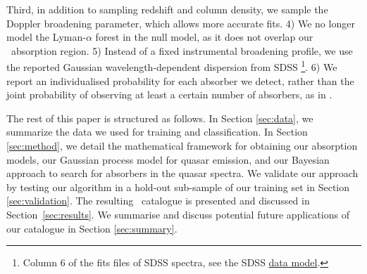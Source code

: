 \documentclass[fleqn,usenatbib]{mnras}
\newcommand{\civ}{\ion{C}{IV}}
\begin{document}
Third, in addition to sampling redshift and column density, we sample the Doppler broadening parameter, which allows more accurate fits.
4) We no longer model the Lyman-$\alpha$ forest in the null model, as it does not overlap our \civ\ absorption region.
5) Instead of a fixed instrumental broadening profile, we use the
reported Gaussian wavelength-dependent dispersion from SDSS \footnote{Column 6 of the fits files of SDSS spectra, see the SDSS
\href{https://data.sdss.org/datamodel/files/BOSS_SPECTRO_REDUX/RUN2D/spectra/PLATE4/spec.html}{data model}.}.
6) We report an individualised probability for each absorber we detect, rather than the
joint probability of observing at least a certain number of absorbers, as in \cite{mfDLA}.

The rest of this paper is structured as follows. In Section \ref{sec:data}, we summarize the data %
we used for training and classification. In Section \ref{sec:method}, we detail the mathematical
framework for obtaining our absorption models, our Gaussian process model for quasar emission, and our Bayesian approach to search for absorbers in the quasar spectra. We validate our approach by testing our algorithm in a hold-out sub-sample of our training set in Section \ref{sec:validation}. The resulting \civ\ catalogue is presented and discussed in Section~\ref{sec:results}. We summarise and discuss potential future applications of our catalogue in Section \ref{sec:summary}.



\end{document}
